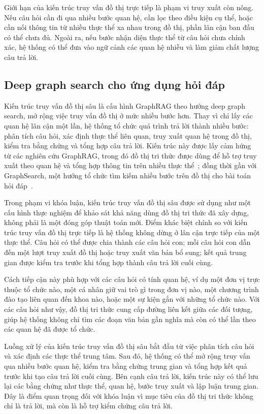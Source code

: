 Giới hạn của kiến trúc truy vấn đồ thị trực tiếp là phạm vi truy xuất còn nông. Nếu câu hỏi cần đi qua nhiều bước quan hệ, cần lọc theo điều kiện cụ thể, hoặc cần nối thông tin từ nhiều thực thể xa nhau trong đồ thị, phần lân cận ban đầu có thể chưa đủ. Ngoài ra, nếu bước nhận diện thực thể từ câu hỏi chưa chính xác, hệ thống có thể đưa vào ngữ cảnh các quan hệ nhiễu và làm giảm chất lượng câu trả lời.

\subsection{Deep graph search cho ứng dụng hỏi đáp}

Kiến trúc truy vấn đồ thị sâu là cấu hình GraphRAG theo hướng deep graph search, mở rộng việc truy vấn đồ thị ở mức nhiều bước hơn. Thay vì chỉ lấy các quan hệ lân cận một lần, hệ thống tổ chức quá trình trả lời thành nhiều bước: phân tích câu hỏi, xác định thực thể liên quan, truy xuất quan hệ trong đồ thị, kiểm tra bằng chứng và tổng hợp câu trả lời. Kiến trúc này được lấy cảm hứng từ các nghiên cứu GraphRAG, trong đó đồ thị tri thức được dùng để hỗ trợ truy xuất theo quan hệ và tổng hợp thông tin trên nhiều thực thể~\cite{edge2024local}; đồng thời gần với GraphSearch, một hướng tổ chức tìm kiếm nhiều bước trên đồ thị cho bài toán hỏi đáp~\cite{yang2025graphsearch}.

Trong phạm vi khóa luận, kiến trúc truy vấn đồ thị sâu được sử dụng như một cấu hình thực nghiệm để khảo sát khả năng dùng đồ thị tri thức đã xây dựng, không phải là một đóng góp thuật toán mới. Điểm khác biệt chính so với kiến trúc truy vấn đồ thị trực tiếp là hệ thống không dừng ở lân cận trực tiếp của một thực thể. Câu hỏi có thể được chia thành các câu hỏi con; mỗi câu hỏi con dẫn đến một lượt truy xuất đồ thị hoặc truy xuất văn bản bổ sung; kết quả trung gian được kiểm tra trước khi tổng hợp thành câu trả lời cuối cùng.

Cách tiếp cận này phù hợp với các câu hỏi có tính quan hệ, ví dụ một đơn vị trực thuộc tổ chức nào, một cá nhân giữ vai trò gì trong đơn vị nào, một chương trình đào tạo liên quan đến khoa nào, hoặc một sự kiện gắn với những tổ chức nào. Với các câu hỏi như vậy, đồ thị tri thức cung cấp đường liên kết giữa các đối tượng, giúp hệ thống không chỉ tìm các đoạn văn bản gần nghĩa mà còn có thể lần theo các quan hệ đã được tổ chức.

Luồng xử lý của kiến trúc truy vấn đồ thị sâu bắt đầu từ việc phân tích câu hỏi và xác định các thực thể trung tâm. Sau đó, hệ thống có thể mở rộng truy vấn qua nhiều bước quan hệ, kiểm tra bằng chứng trung gian và tổng hợp kết quả trước khi tạo câu trả lời cuối cùng. Bên cạnh câu trả lời, kiến trúc này có thể lưu lại các bằng chứng như thực thể, quan hệ, bước truy xuất và lập luận trung gian. Đây là điểm quan trọng đối với khóa luận vì mục tiêu của đồ thị tri thức không chỉ là trả lời, mà còn là hỗ trợ kiểm chứng câu trả lời.

